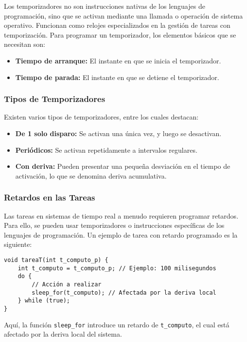 \documentclass[a4paper,12pt]{article}
\begin{document}
Los temporizadores no son instrucciones nativas de los lenguajes de programación, sino que se activan mediante una llamada o operación de sistema operativo. Funcionan como relojes especializados en la gestión de tareas con temporización. Para programar un temporizador, los elementos básicos que se necesitan son:
\begin{itemize}
    \item \textbf{Tiempo de arranque:} El instante en que se inicia el temporizador.
    \item \textbf{Tiempo de parada:} El instante en que se detiene el temporizador.
\end{itemize}

\subsubsection{Tipos de Temporizadores}

Existen varios tipos de temporizadores, entre los cuales destacan:
\begin{itemize}
    \item \textbf{De 1 solo disparo:} Se activan una única vez, y luego se desactivan.
    \item \textbf{Periódicos:} Se activan repetidamente a intervalos regulares.
    \item \textbf{Con deriva:} Pueden presentar una pequeña desviación en el tiempo de activación, lo que se denomina deriva acumulativa.
\end{itemize}

\subsubsection{Retardos en las Tareas}

Las tareas en sistemas de tiempo real a menudo requieren programar retardos. Para ello, se pueden usar temporizadores o instrucciones específicas de los lenguajes de programación. Un ejemplo de tarea con retardo programado es la siguiente:

\begin{lstlisting}[style=customcpp]
void tareaT(int t_computo_p) {
    int t_computo = t_computo_p; // Ejemplo: 100 milisegundos
    do {
        // Acción a realizar
        sleep_for(t_computo); // Afectada por la deriva local
    } while (true);
}
\end{lstlisting}

Aquí, la función \texttt{sleep\_for} introduce un retardo de \texttt{t\_computo}, el cual está afectado por la deriva local del sistema.
\end{document}
